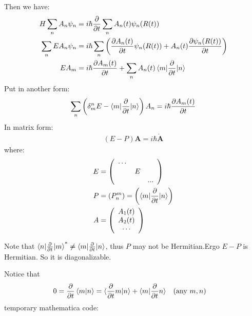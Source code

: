 \documentclass{article}
\numberwithin{equation}{subsection} %
\theoremstyle{definition}
\begin{document}
    Then we have:
    \begin{align}
    H \sum_n A_n \psi_n &=i\hbar\frac{\partial }{\partial t}
	  	\sum_n A_n(t) \psi_n(R(t)) \nonumber\\
	\sum_n E A_n \psi_n&=i\hbar\sum_n
		\left(
		\frac{\partial A_n(t)}{\partial t}\psi_n(R(t))+
		A_n(t)\frac{\partial \psi_n(R(t))}{\partial t}
		\right) \nonumber\\
	E A_m &=i\hbar
		\frac{\partial A_m(t)}{\partial t}
		+\sum_n A_n(t)\braket{m|\frac{\partial }{\partial t}|n}
    \end{align}
    Put in another form:
    $$
    \sum_n \left(\delta^n_m E
        - \braket{m| \frac{\partial}{\partial t}|n} \right) A_n
        =
    i\hbar \frac{\partial A_m(t)}{\partial t}
    $$
    In matrix form:
    \begin{align}
            (E - P) \mathbf{A} = i\hbar \dot{\mathbf{A}}
    \end{align}
    where:
    \begin{align}
        E &= \left(
        \begin{array}{ccc}
         \cdots   &     &   \\
              & E &   \\
             &    & \text{...} \\
        \end{array}
        \right) \\
        P &= (P^m_n) = \left(
        \braket{m| \frac{\partial}{\partial t}|n}\right)\\
        A &= \left(\begin{array}{c}
            A_1(t) \\
            A_2(t) \\
            \cdots \\
        \end{array}\right)
    \end{align}
    
    Note that $\braket{n| \frac{\partial}{\partial t}|m}^* \neq
    \braket{m| \frac{\partial}{\partial t} |n}$, thus $P$ may not be
    Hermitian.Ergo $E-P$ is Hermitian. So it is diagonalizable.

    Notice that
    \begin{align}
            0= \frac{\partial}{\partial t} \braket{m|n} &=
        \braket{\frac{\partial}{\partial t}m|n} +
        \braket{m|\frac{\partial}{\partial t}n} &&(\text{any }m,n)
    \end{align}
    temporary mathematica code:
\end{document}
